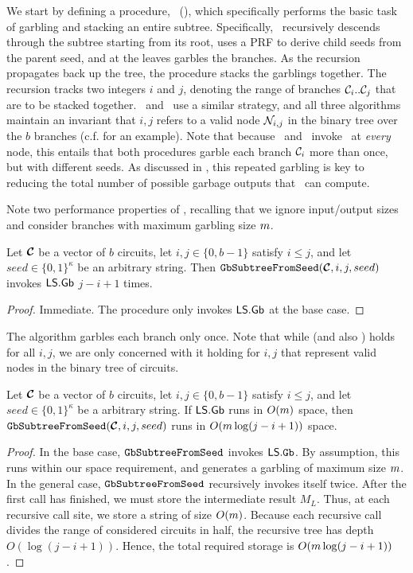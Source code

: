 We start by defining a procedure, \gbtree~(),
which specifically performs the basic task of garbling and stacking an entire
subtree.
%
Specifically, \gbtree\ recursively descends through the
subtree starting from its root, uses a PRF to derive child seeds from the parent seed, and at the
leaves garbles the branches.
As the recursion propagates back up the tree, the procedure stacks the
garblings together.
%
The recursion tracks two integers $i$ and
$j$, denoting the range of branches $\mathcal C_i..\mathcal C_j$ that are to
be stacked together.
\evcond\ and \gbcond\ use a similar strategy, and all three algorithms
maintain an invariant that $i,j$ refers to a valid node $\mathtt{\cal N}_{i,j}$ in the binary
tree over the $b$ branches (c.f.  for an
example).
%
Note that because \evcond\ and \gbcond\ invoke \gbtree\ at
\emph{every} node, this entails that both procedures garble
each branch $\mathcal C_i$ more than once, but with different seeds.
As discussed in , this repeated garbling is key
to reducing the total number of possible garbage outputs that \E\
can compute.


Note two performance properties of \gbtree, recalling that we ignore
input/output sizes and consider branches with maximum
garbling size $m$.
\begin{lemma}\label{lemma:gbtreetime}
  Let $\vec{\cir}$ be a vector of $b$ circuits,
  let $i, j \in \{0, b-1\}$ satisfy $i \leq j$,
  and let $seed \in \{0, 1\}^\kappa$ be an arbitrary string.
  Then $\gbtree(\vec \cir, i, j, seed)$ invokes $\textsf{LS}.\textsf{Gb}$ $j - i + 1$ times.
\end{lemma}
\begin{proof}
  Immediate. The procedure only invokes $\textsf{LS}.\textsf{Gb}$ at the base case.
\end{proof}
The algorithm garbles each branch only once.
Note that while  (and also
) holds for all $i, j$, we are
only concerned with it holding for $i, j$ that represent valid nodes
in the binary tree of circuits.


\begin{lemma}\label{lemma:gbtreespace}
  Let $\vec{\cir}$ be a vector of $b$ circuits,
  let $i, j \in \{0, b-1\}$ satisfy $i \leq j$,
  and let $seed \in \{0, 1\}^\kappa$ be a arbitrary string.
  If $\textsf{LS}.\mathsf{Gb}$ runs in $O(m)$ space,
  then $\gbtree(\vec \cir, i, j, seed)$ runs in $O(m \log (j-i+1))$ space.
\end{lemma}
\begin{proof}
  In the base case, $\mathtt{GbSubtreeFromSeed}$ invokes $\textsf{LS}.\mathtt{Gb}$. By assumption, this runs
  within our space requirement, and generates a garbling of maximum
  size $m$.
  In the general case, $\mathtt{GbSubtreeFromSeed}$ recursively invokes itself twice.
  After the first call has finished, we must store the
  intermediate result $M_L$.
  Thus, at each recursive call site, we store a string of size
  $O(m)$.
  Because each recursive call divides the range of considered circuits
  in half, the recursive tree has depth $O(\log(j-i+1))$.
  Hence, the total required storage is $O(m \log(j-i+1))$.
\end{proof}

